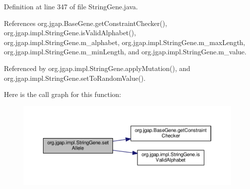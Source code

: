 Definition at line 347 of file String\-Gene.\-java.



References org.\-jgap.\-Base\-Gene.\-get\-Constraint\-Checker(), org.\-jgap.\-impl.\-String\-Gene.\-is\-Valid\-Alphabet(), org.\-jgap.\-impl.\-String\-Gene.\-m\-\_\-alphabet, org.\-jgap.\-impl.\-String\-Gene.\-m\-\_\-max\-Length, org.\-jgap.\-impl.\-String\-Gene.\-m\-\_\-min\-Length, and org.\-jgap.\-impl.\-String\-Gene.\-m\-\_\-value.



Referenced by org.\-jgap.\-impl.\-String\-Gene.\-apply\-Mutation(), and org.\-jgap.\-impl.\-String\-Gene.\-set\-To\-Random\-Value().



Here is the call graph for this function\-:
\nopagebreak
\begin{figure}[H]
\begin{center}
\leavevmode
\includegraphics[width=350pt]{classorg_1_1jgap_1_1impl_1_1_string_gene_ad85c7164cd5ed0dfb4abf496ae3ec29b_cgraph}
\end{center}
\end{figure}


